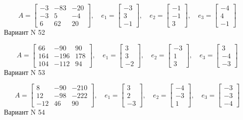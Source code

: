 \documentclass[11pt]{report}
\begin{document}
$$A = \left[\begin{matrix}-3 & -83 & -20\\-3 & 5 & -4\\6 & 62 & 20\end{matrix}\right],\quad e_1 = \left[\begin{matrix}-3\\3\\-1\end{matrix}\right],\quad e_2 = \left[\begin{matrix}-1\\-1\\3\end{matrix}\right],\quad e_3 = \left[\begin{matrix}-4\\4\\-1\end{matrix}\right]$$Вариант N 52

$$A = \left[\begin{matrix}66 & -90 & 90\\164 & -196 & 178\\104 & -112 & 94\end{matrix}\right],\quad e_1 = \left[\begin{matrix}3\\3\\-2\end{matrix}\right],\quad e_2 = \left[\begin{matrix}-3\\1\\3\end{matrix}\right],\quad e_3 = \left[\begin{matrix}3\\-4\\-3\end{matrix}\right]$$Вариант N 53

$$A = \left[\begin{matrix}8 & -90 & -210\\12 & -98 & -222\\-12 & 46 & 90\end{matrix}\right],\quad e_1 = \left[\begin{matrix}3\\2\\-3\end{matrix}\right],\quad e_2 = \left[\begin{matrix}-4\\-3\\1\end{matrix}\right],\quad e_3 = \left[\begin{matrix}-3\\-3\\-4\end{matrix}\right]$$Вариант N 54
\end{document}
